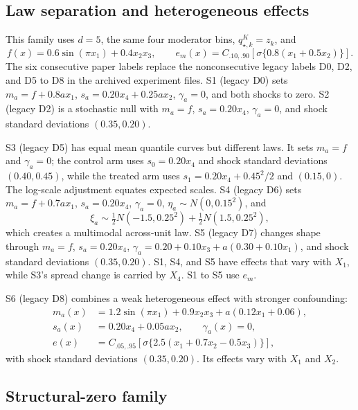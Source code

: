 \subsection{Law separation and heterogeneous effects}

This family uses $d=5$, the same four moderator bins, $q_{\star,k}^K=z_k$, and
\[
 f(x)=0.6\sin(\pi x_1)+0.4x_2x_3,\qquad
 e_m(x)=C_{.10,.90}[\sigma\{0.8(x_1+0.5x_2)\}].
\]
The six consecutive paper labels replace the nonconsecutive legacy labels D0, D2, and D5 to D8 in the archived experiment files. S1 (legacy D0) sets $m_a=f+0.8ax_1$, $s_a=0.20x_4+0.25ax_2$, $\gamma_a=0$, and both shocks to zero. S2 (legacy D2) is a stochastic null with $m_a=f$, $s_a=0.20x_4$, $\gamma_a=0$, and shock standard deviations $(0.35,0.20)$.

S3 (legacy D5) has equal mean quantile curves but different laws. It sets $m_a=f$ and $\gamma_a=0$; the control arm uses $s_0=0.20x_4$ and shock standard deviations $(0.40,0.45)$, while the treated arm uses $s_1=0.20x_4+0.45^2/2$ and $(0.15,0)$. The log-scale adjustment equates expected scales. S4 (legacy D6) sets $m_a=f+0.7ax_1$, $s_a=0.20x_4$, $\gamma_a=0$, $\eta_a\sim N(0,0.15^2)$, and
\[
 \xi_a\sim\tfrac12N(-1.5,0.25^2)+\tfrac12N(1.5,0.25^2),
\]
which creates a multimodal across-unit law. S5 (legacy D7) changes shape through $m_a=f$, $s_a=0.20x_4$, $\gamma_a=0.20+0.10x_3+a(0.30+0.10x_1)$, and shock standard deviations $(0.35,0.20)$. S1, S4, and S5 have effects that vary with $X_1$, while S3's spread change is carried by $X_4$. S1 to S5 use $e_m$.

S6 (legacy D8) combines a weak heterogeneous effect with stronger confounding:
\begin{align*}
 m_a(x)&=1.2\sin(\pi x_1)+0.9x_2x_3+a(0.12x_1+0.06),\\
 s_a(x)&=0.20x_4+0.05ax_2,\qquad\gamma_a(x)=0,\\
 e(x)&=C_{.05,.95}[\sigma\{2.5(x_1+0.7x_2-0.5x_3)\}],
\end{align*}
with shock standard deviations $(0.35,0.20)$. Its effects vary with $X_1$ and $X_2$.

\subsection{Structural-zero family}


